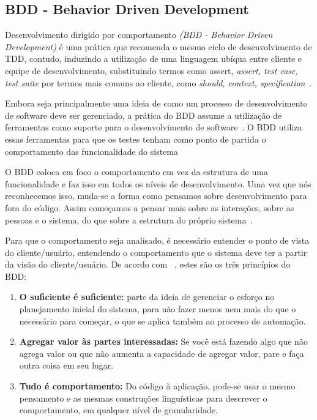 \subsection{BDD - Behavior Driven Development}

Desenvolvimento dirigido por comportamento \textit{(BDD - Behavior Driven Development)} 
é uma prática que recomenda o mesmo ciclo de desenvolvimento de TDD, contudo, induzindo 
a utilização de uma linguagem ubíqua entre cliente e equipe de desenvolvimento, substituindo termos como assert, \textit{assert, test case, test suite} por termos 
mais comuns ao cliente, como \textit{should, context, specification}~\cite{bernardo2011}.

Embora seja principalmente uma ideia de como um processo de desenvolvimento de 
software deve ser gerenciado, a prática do BDD assume a utilização de ferramentas 
como suporte para o desenvolvimento de software~\cite{haring2011}. O BDD utiliza 
essas ferramentas para que os testes tenham como ponto de partida o comportamento 
das funcionalidade do sistema

O BDD coloca em foco o comportamento em vez da estrutura de uma funcionalidade e faz isso em todos os níveis de desenvolvimento. Uma vez que nós reconhecemos isso, muda-se a forma como pensamos sobre desenvolvimento para fora do código. Assim começamos a pensar mais sobre as interações, sobre as pessoas e o sistema, do que sobre a 
estrutura do próprio sistema~\cite{chelimsky2010}.

Para que o comportamento seja analisado, é necessário entender o ponto de vista do 
cliente/usuário, entendendo o comportamento que o sistema deve ter a partir da
visão do cliente/usuário. 
%
De acordo com ~, estes são os três princípios do BDD:

\begin{enumerate}
\item \textbf{O suficiente é suficiente:} parte da ideia de gerenciar o esforço no 
planejamento inicial do sistema, para não fazer menos nem mais do que o necessário 
para começar, o que se aplica também ao processo de automação.

\item \textbf{Agregar valor às partes interessadas:} Se você está fazendo algo que 
não agrega valor ou que não aumenta a capacidade de agregar valor, pare e faça outra 
coisa em seu lugar.

\item \textbf{Tudo é comportamento:} Do código à aplicação, pode-se usar o mesmo 
pensamento e as mesmas construções linguísticas para descrever o comportamento, em 
qualquer nível de granularidade. 
\end{enumerate}


